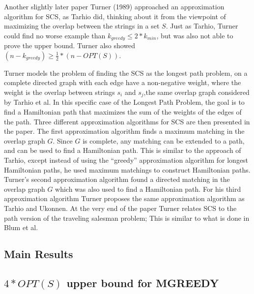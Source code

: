 \documentclass[letterpaper,11pt,titlepage]{article}
\begin{document}
Another slightly later paper Turner (1989) \cite{turner1989approximation} approached an approximation algorithm for SCS, as Tarhio did, thinking about it from the viewpoint of maximizing the overlap between the strings in a set $S$.  Just as Tarhio, Turner could find no worse example than $k_{greedy} \leq 2* k_{min}$, but was also not able to prove the upper bound.  Turner also showed $(n - k_{greedy}) \geq \frac{1}{2}*(n - OPT(S))$. 

Turner models the problem of finding the SCS as the longest path problem, on a complete directed graph with each edge have a non-negative weight, where the weight is the overlap between strings $s_i$ and $s_j$,the same overlap graph considered by Tarhio et al.  In this specific case of the Longest Path Problem, the goal is to find a Hamiltonian path that maximizes the sum of the weights of the edges of the path. 
Three different approximation algorithms for SCS are then presented in the paper. The first approximation algorithm finds a maximum matching in the overlap graph $G$.  Since $G$ is complete, any matching can be extended to a path, and can be used to find a Hamiltonian path.  This is similar to the approach of Tarhio, except instead of using the ``greedy'' approximation algorithm for longest Hamiltonian paths, he used maximum matchings to construct Hamiltonian paths.  Turner's second approximation algorithm found a directed matching in the overlap graph $G$ which was also used to find a Hamiltonian path.  For his third approximation algorithm Turner proposes the same approximation algorithm as Tarhio and Ukonnen. At the very end of the paper Turner relates SCS to the path version of the traveling salesman problem; This is similar to what is done in Blum et al. 


\subsection*{Main Results}

\subsection*{$4 * OPT(S)$ upper bound for MGREEDY}
\end{document}

